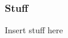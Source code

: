 \documentclass{beamer}
\begin{document}
\begin{frame}
\frametitle{Stuff}
Insert stuff here

\end{frame}
\end{document}
